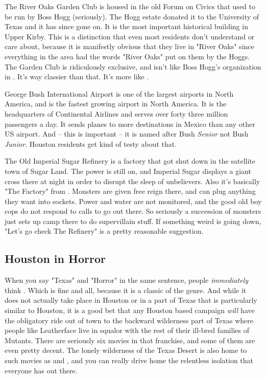 The River Oaks Garden Club is housed in the old Forum on Civics that used to be run by Boss Hogg (seriously). The Hogg estate donated it to the University of Texas and it has since gone on. It is the most important historical building in Upper Kirby. This is a distinction that even most residents don't understand or care about, because it is manifestly obvious that they live in "River Oaks" since everything in the area had the words "River Oaks" put on them by the Hoggs. The Garden Club is ridiculously exclusive, and isn't like Boss Hogg's organization in . It's way classier than that. It's more like .

George Bush International Airport is one of the largest airports in North America, and is the fastest growing airport in North America. It is the headquarters of Continental Airlines and serves over forty three million passengers a day. It sends planes to more destinations in Mexico than any other US airport. And -- this is important -- it is named after Bush \textit{Senior} not Bush \textit{Junior}. Houston residents get kind of testy about that.

The Old Imperial Sugar Refinery is a factory that got shut down in the satellite town of Sugar Land. The power is still on, and Imperial Sugar displays a giant cross there at night in order to disrupt the sleep of unbelievers. Also it's basically "The Factory" from . Monsters are given free reign there, and can plug anything they want into sockets. Power and water are not monitored, and the good old boy cops do not respond to calls to go out there. So seriously a succession of monsters just sets up camp there to do supervillain stuff. If something weird is going down, "Let's go check The Refinery" is a pretty reasonable suggestion.

\subsection{Houston in Horror}

\hspace{\parindent} When you say "Texas" and "Horror" in the same sentence, people \textit{immediately} think . Which is fine and all, because it is a classic of the genre. And while it does not actually take place in Houston or in a part of Texas that is particularly similar to Houston, it is a good bet that any Houston based campaign \textit{will} have the obligatory ride out of town to the backward wilderness part of Texas where people like Leatherface live in squalor with the rest of their ill-bred families of Mutants. There are seriously six movies in that franchise, and some of them are even pretty decent. The lonely wilderness of the Texas Desert is also home to such movies as  and , and you can really drive home the relentless isolation that everyone has out there.

